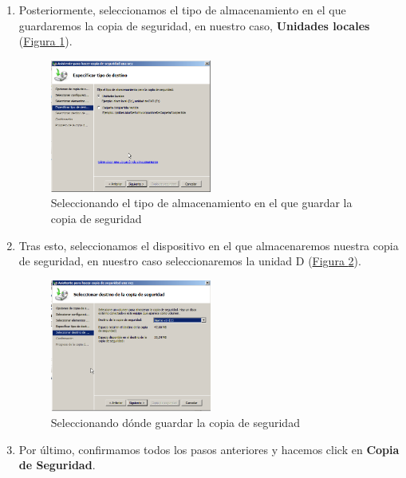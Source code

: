 \documentclass[10pt,a4paper,spanish]{article}
\numberwithin{equation}{section} %
\numberwithin{figure}{section} %
\numberwithin{table}{section} %
\begin{document}
\begin{enumerate}[1.]
    \item Posteriormente, seleccionamos el tipo de almacenamiento en el que guardaremos la copia de seguridad, en nuestro caso, \textbf{Unidades locales} (\hyperref[cuartopasocopiaseg]{Figura \ref*{cuartopasocopiaseg}}).

    \begin{figure}[!h]
        \centering
        \includegraphics[width=0.5\textwidth]{7}
        \caption{Seleccionando el tipo de almacenamiento en el que guardar la copia de seguridad}
        \label{cuartopasocopiaseg}
    \end{figure}

    \item Tras esto, seleccionamos el dispositivo en el que almacenaremos nuestra copia de seguridad, en nuestro caso seleccionaremos la unidad D (\hyperref[quintopasocopiaseg]{Figura \ref*{quintopasocopiaseg}}).

    \begin{figure}[!h]
        \centering
        \includegraphics[width=0.5\textwidth]{8}
        \caption{Seleccionando dónde guardar la copia de seguridad}
        \label{quintopasocopiaseg}
    \end{figure}

    \item Por último, confirmamos todos los pasos anteriores y hacemos click en \textbf{Copia de Seguridad}.


\end{enumerate}
\end{document}
